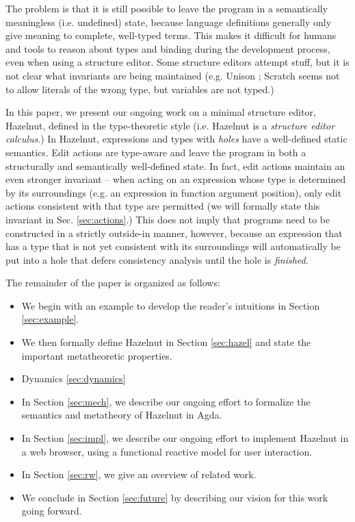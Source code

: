 The problem is that it is still possible to leave the program in a semantically meaningless (i.e. undefined) state, because language definitions generally only give meaning to complete, well-typed terms. This makes it difficult for humans and tools to reason about types and binding during the development process, even when using a structure editor. Some structure editors attempt stuff, but it is not clear what invariants are being maintained (e.g. Unison ; Scratch seems not to allow literals of the wrong type, but variables are not typed.) %


In this paper, we present our ongoing work on a minimal structure editor, Hazelnut,  defined in the type-theoretic style (i.e. Hazelnut is a \emph{structure editor calculus}.) In Hazelnut, expressions and types with \emph{holes} have a well-defined static semantics. Edit actions are type-aware and leave the program in both a structurally and semantically well-defined state. In fact, edit actions maintain an even stronger invariant -- when acting on an expression whose type is determined by its surroundings (e.g. an expression in function argument position), only edit actions consistent with that type are permitted (we will formally state this invariant in Sec. \ref{sec:actions}.) This does not imply that programs need to be constructed in a strictly outside-in manner, however, because an expression that has a type that is not yet consistent with its surroundings will automatically be put into a {hole} that defers consistency analysis until the hole is \emph{finished}.

The remainder of the paper is organized as follows:
\begin{itemize}
  \item We begin with an example to develop the reader's intuitions in Section
    \ref{sec:example}.

  \item We then formally define Hazelnut in Section \ref{sec:hazel} and state the important metatheoretic properties.
  \item Dynamics \ref{sec:dynamics}

  \item In Section \ref{sec:mech}, we describe our ongoing effort to formalize the semantics and metatheory of Hazelnut in Agda.

  \item In Section \ref{sec:impl}, we describe our ongoing effort to implement Hazelnut in a web browser, using a functional reactive model for user interaction.
  \item In Section \ref{sec:rw}, we give an overview of related work.
  \item We conclude in Section \ref{sec:future} by describing our vision for this work going 
    forward.
\end{itemize}
